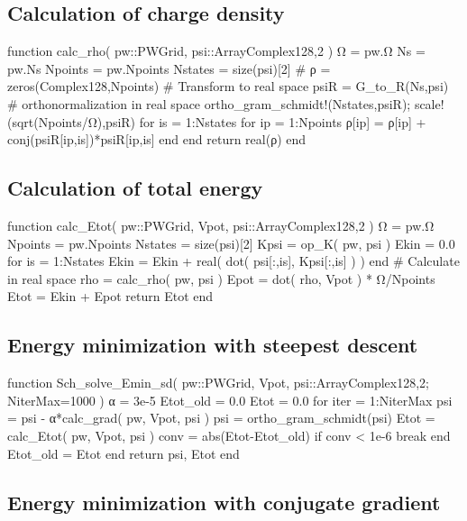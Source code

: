 \subsection{Calculation of charge density}

\begin{juliacode}
function calc_rho( pw::PWGrid, psi::Array{Complex128,2} )
  Ω = pw.Ω
  Ns = pw.Ns
  Npoints = pw.Npoints
  Nstates = size(psi)[2]
  #
  ρ = zeros(Complex128,Npoints)
  # Transform to real space
  psiR = G_to_R(Ns,psi)
  # orthonormalization in real space
  ortho_gram_schmidt!(Nstates,psiR); scale!(sqrt(Npoints/Ω),psiR)
  for is = 1:Nstates
    for ip = 1:Npoints
      ρ[ip] = ρ[ip] + conj(psiR[ip,is])*psiR[ip,is]
    end
  end
  return real(ρ)
end
\end{juliacode}


\subsection{Calculation of total energy}


\begin{juliacode}
function calc_Etot( pw::PWGrid, Vpot, psi::Array{Complex128,2} )
  Ω = pw.Ω
  Npoints = pw.Npoints
  Nstates = size(psi)[2]
  Kpsi = op_K( pw, psi )
  Ekin = 0.0
  for is = 1:Nstates
    Ekin = Ekin + real( dot( psi[:,is], Kpsi[:,is] ) )
  end
  # Calculate in real space
  rho = calc_rho( pw, psi )
  Epot = dot( rho, Vpot ) * Ω/Npoints
  Etot = Ekin + Epot
  return Etot
end
\end{juliacode}


\subsection{Energy minimization with steepest descent}

\begin{juliacode}
function Sch_solve_Emin_sd( pw::PWGrid, Vpot, psi::Array{Complex128,2};
                            NiterMax=1000 )
  α = 3e-5
  Etot_old = 0.0
  Etot = 0.0
  for iter = 1:NiterMax
    psi = psi - α*calc_grad( pw, Vpot, psi )
    psi  = ortho_gram_schmidt(psi)
    Etot = calc_Etot( pw, Vpot, psi )
    conv = abs(Etot-Etot_old)
    if conv < 1e-6
      break
    end
    Etot_old = Etot
  end
  return psi, Etot
end
\end{juliacode}


\subsection{Energy minimization with conjugate gradient}

